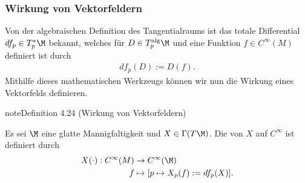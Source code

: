 \documentclass[letterpaper,10pt,english]{jupyterBook}
\begin{document}
\subsubsection{Wirkung von Vektorfeldern}
\label{\detokenize{manifolds/tangential:wirkung-von-vektorfeldern}}
\sphinxAtStartPar
Von der algebraischen Definition des Tangentialraums ist das totale Differential \(df_p\in T^\ast_p\M\) bekannt, welches für \(D\in T^{\text{alg}}_p\M\) und eine Funktion \(f\in C^\infty(M)\) definiert ist durch
\begin{equation*}
\begin{split}df_p(D):= D(f).\end{split}
\end{equation*}
\sphinxAtStartPar
Mithilfe dieses mathematischen Werkzeugs können wir nun die Wirkung eines Vektorfelds definieren.
\label{manifolds/tangential:def:wirkung}
\begin{sphinxadmonition}{note}{Definition 4.24 (Wirkung von Vektorfeldern)}



\sphinxAtStartPar
Es sei \(\M\) eine glatte Mannigfaltigkeit und \(X\in\Gamma(T\M)\).
Die  von \(X\) auf \(C^\infty\) ist definiert durch
\begin{equation*}
\begin{split}X(\cdot):C^\infty(M) &\to C^\infty(\M)\\
f &\mapsto [p\mapsto X_p(f) := df_p(X)].\end{split}
\end{equation*}\end{sphinxadmonition}
\end{document}
